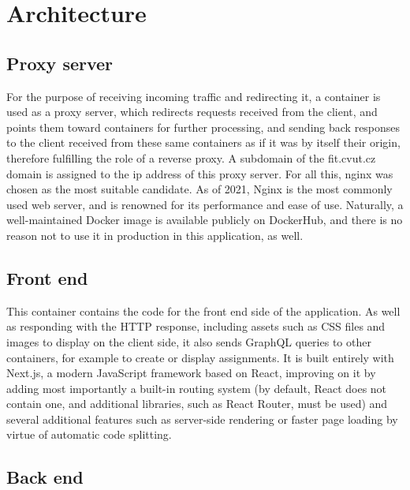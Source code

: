 \documentclass[thesis=B,english]{FITthesis}[2019/12/23]
\begin{document}
\section{Architecture}

\subsection{Proxy server}

For the purpose of receiving incoming traffic and redirecting it, a container is used as a proxy server, which redirects requests received from the client, and points them toward containers for further processing, and sending back responses to the client received from these same containers as if it was by itself their origin, therefore fulfilling the role of a reverse proxy. \cite{proxies} A subdomain of the fit.cvut.cz domain is assigned to the ip address of this proxy server.
\newline
For all this, nginx was chosen as the most suitable candidate. As of 2021, Nginx is the most commonly used web server, and is renowned for its performance and ease of use. \cite{netcraft} Naturally, a well-maintained Docker image is available publicly on DockerHub, and there is no reason not to use it in production in this application, as well.

\subsection{Front end}

This container contains the code for the front end side of the application. As well as responding with the HTTP response, including assets such as CSS files and images to display on the client side, it also sends GraphQL queries to other containers, for example to create or display assignments. 
\newline
It is built entirely with Next.js, a modern JavaScript framework based on React, improving on it by adding most importantly a built-in routing system (by default, React does not contain one, and additional libraries, such as React Router, must be used) and several additional features such as server-side rendering or faster page loading by virtue of automatic code splitting.

\subsection{Back end}
\end{document}
